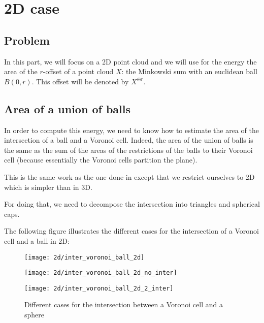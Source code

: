 \chapter{2D case}

\section{Problem}
In this part, we will focus on a 2D point cloud and we will use for the energy
the area of the $ r $-offset of a point cloud $ X $: the Minkowski sum with an euclidean
ball $ B(0, r) $. This offset will be denoted by $ X^{\oplus r} $.

\section{Area of a union of balls}
In order to compute this energy, we need to know how to estimate the area of the
intersection of a ball and a Voronoi cell. Indeed, the area of the union of
balls is the same as the sum of the areas of the restrictions of the balls to
their Voronoi cell (because essentially the Voronoi cells partition the plane).

This is the same work as the one done in \cite{cazals2011computing} except that
we restrict ourselves to 2D which is simpler than in 3D.

For doing that, we need to decompose the intersection into triangles and
spherical caps.

The following figure illustrates the different cases for the intersection of a
Voronoi cell and a ball in 2D:
\begin{figure}[H]
    \centering
    \begin{minipage}{0.32\linewidth}
        \centering
        \texttt{[image: 2d/inter\_voronoi\_ball\_2d]}
        \label{fig:inter_voronoi_ball_2d:a}
    \end{minipage}
    \begin{minipage}{0.32\linewidth}
        \centering
        \texttt{[image: 2d/inter\_voronoi\_ball\_2d\_no\_inter]}
        \label{fig:inter_voronoi_ball_2d:b}
    \end{minipage}
    \begin{minipage}{0.32\linewidth}
        \centering
        \texttt{[image: 2d/inter\_voronoi\_ball\_2d\_2\_inter]}
        \label{fig:inter_voronoi_ball_2d:c}
    \end{minipage}

   \caption{Different cases for the intersection between a Voronoi cell and a sphere}
   \label{fig:inter_voronoi_ball_2d}
\end{figure}

